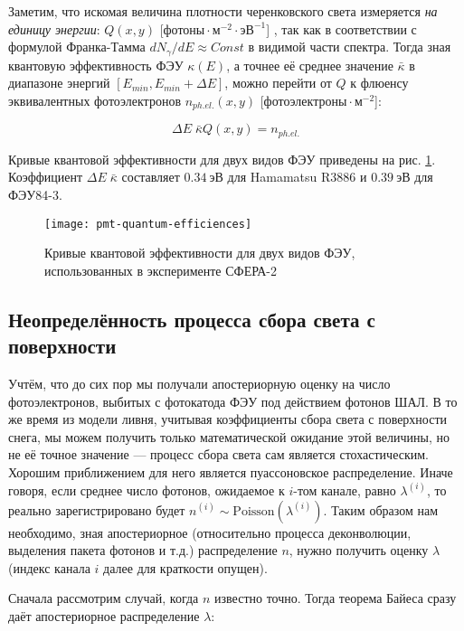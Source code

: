 Заметим, что искомая величина плотности черенковского света измеряется \textit{на единицу энергии}: $Q(x, y)$ [$\text{фотоны} \cdot \text{м}^{-2} \cdot \text{эВ}^{-1}$] \cite{Budnev2005}, так как в соответствии с формулой Франка-Тамма \cite{Tamm1939} $dN _{\gamma}/dE \approx Const$ в видимой части спектра. Тогда зная квантовую эффективность ФЭУ $\kappa(E)$, а точнее её среднее значение $\bar{\kappa}$ в диапазоне энергий $[E_{min}, E_{min} + \Delta E]$, можно перейти от $Q$ к флюенсу эквивалентных фотоэлектронов $n_{ph. el.} (x, y)$ [$\text{фотоэлектроны} \cdot \text{м}^{-2}$]:

\begin{equation}
	\Delta E \; \bar{\kappa} Q(x, y) = n_{ph. el.}
\end{equation}

Кривые квантовой эффективности для двух видов ФЭУ приведены на рис. \ref{pic:pmt-quanteffs}. Коэффициент $\Delta E \; \bar{\kappa}$ составляет $0.34~\text{эВ}$ для Hamamatsu R3886 и $0.39~\text{эВ}$ для ФЭУ84-3.

\begin{figure}[H]
	\centering
	\texttt{[image: pmt-quantum-efficiences]}
	\caption{Кривые квантовой эффективности для двух видов ФЭУ, использованных в эксперименте СФЕРА-2}
	\label{pic:pmt-quanteffs}
\end{figure}


\subsection{Неопределённость процесса сбора света с поверхности}

Учтём, что до сих пор мы получали апостериорную оценку на число фотоэлектронов, выбитых с фотокатода ФЭУ под действием фотонов ШАЛ. В то же время из модели ливня, учитывая коэффициенты сбора света с поверхности снега, мы можем получить только математической ожидание этой величины, но не её точное значение --- процесс сбора света сам является стохастическим. Хорошим приближением для него является пуассоновское распределение. Иначе говоря, если среднее число фотонов, ожидаемое к $i$-том канале, равно $\lambda^{(i)}$, то реально зарегистрировано будет $n^{(i)} \sim \mathrm{Poisson}(\lambda^{(i)})$. Таким образом нам необходимо, зная апостериорное (относительно процесса деконволюции, выделения пакета фотонов и т.д.) распределение $n$, нужно получить оценку $\lambda$ (индекс канала $i$ далее для краткости опущен).

Сначала рассмотрим случай, когда $n$ известно точно. Тогда теорема Байеса сразу даёт апостериорное распределение $\lambda$:


